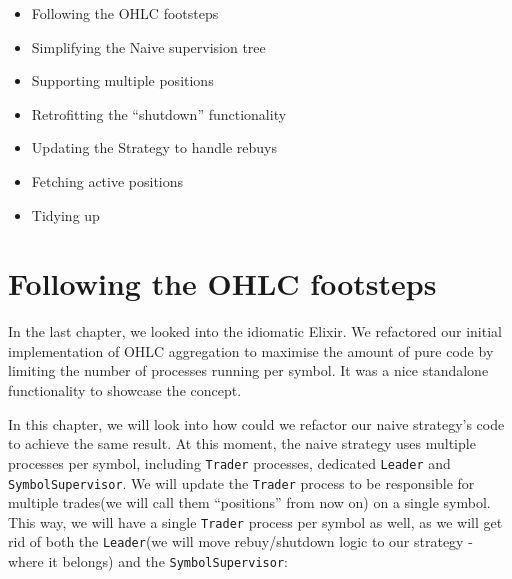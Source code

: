 \documentclass[
  oneside]{book}
\providecommand{\tightlist}{%
  \setlength{\itemsep}{0pt}\setlength{\parskip}{0pt}}
\begin{document}
\begin{itemize}
\tightlist
\item
  Following the OHLC footsteps
\item
  Simplifying the Naive supervision tree
\item
  Supporting multiple positions
\item
  Retrofitting the ``shutdown'' functionality
\item
  Updating the Strategy to handle rebuys
\item
  Fetching active positions
\item
  Tidying up
\end{itemize}

\section{Following the OHLC footsteps}\label{following-the-ohlc-footsteps}

In the last chapter, we looked into the idiomatic Elixir. We refactored our initial implementation of OHLC aggregation to maximise the amount of pure code by limiting the number of processes running per symbol. It was a nice standalone functionality to showcase the concept.

In this chapter, we will look into how could we refactor our naive strategy's code to achieve the same result. At this moment, the naive strategy uses multiple processes per symbol, including \texttt{Trader} processes, dedicated \texttt{Leader} and \texttt{SymbolSupervisor}. We will update the \texttt{Trader} process to be responsible for multiple trades(we will call them ``positions'' from now on) on a single symbol. This way, we will have a single \texttt{Trader} process per symbol as well, as we will get rid of both the \texttt{Leader}(we will move rebuy/shutdown logic to our strategy - where it belongs) and the \texttt{SymbolSupervisor}:
\end{document}
